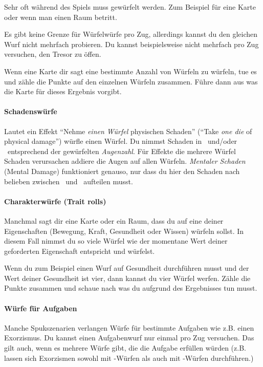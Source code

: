 Sehr oft während des Spiels muss gewürfelt werden. Zum Beispiel für eine Karte oder wenn man einen Raum betritt.

Es gibt keine Grenze für Würfelwürfe pro Zug, allerdings kannst du den gleichen Wurf nicht mehrfach probieren. Du kannst beispielsweise nicht mehrfach pro Zug versuchen, den Tresor zu öffen.

Wenn eine Karte dir sagt eine bestimmte Anzahl von Würfeln zu würfeln, tue es und zähle die Punkte auf den einzelnen Würfeln zusammen. Führe dann aus was die Karte für dieses Ergebnis vorgibt.

\paragraph{Schadenswürfe} Lautet ein Effekt ``Nehme \emph{einen Würfel} physischen Schaden'' (``Take \emph{one die} of physical damage'') würfle einen Würfel. Du nimmst Schaden in \might\ und/oder \speed\ entsprechend der gewürfelten \emph{Augenzahl}. Für Effekte die mehrere Würfel Schaden verursachen addiere die Augen auf allen Würfeln. \emph{Mentaler Schaden} (Mental Damage) funktioniert genauso, nur dass du hier den Schaden nach belieben zwischen \sanity\ und \know\ aufteilen musst.

\paragraph{Charakterwürfe (Trait rolls)} Manchmal sagt dir eine Karte oder ein Raum, dass du auf eine deiner Eigenschaften (Bewegung, Kraft, Gesundheit oder Wissen) würfeln sollst. In diesem Fall nimmst du so viele Würfel wie der momentane Wert deiner geforderten Eigenschaft entspricht und würfelst.

Wenn du zum Beispiel einen Wurf auf Gesundheit durchführen musst und der Wert deiner Gesundheit ist vier, dann kannst du vier Würfel werfen. Zähle die Punkte zusammen und schaue nach was du aufgrund des Ergebnisses tun musst.

\paragraph{Würfe für Aufgaben} Manche Spukszenarien verlangen Würfe für bestimmte Aufgaben wie z.B. einen Exorzismus. Du kannst einen Aufgabenwurf nur einmal pro Zug versuchen. Das gilt auch, wenn es mehrere Würfe gibt, die die Aufgabe erfüllen würden (z.B. lassen sich Exorzismen sowohl mit \sanity-Würfen als auch mit \know-Würfen durchführen.)

